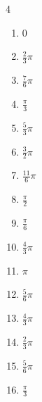 \begin{multicols}{4}
\begin{enumerate}
  \item $\displaystyle 0$

  \item $\displaystyle \frac{2}{3}\pi$

  \item $\displaystyle \frac{7}{6}\pi$

  \item $\displaystyle \frac{\pi}{3}$

  \item $\displaystyle \frac{5}{3}\pi$

  \item $\displaystyle \frac{3}{2}\pi$

  \item $\displaystyle \frac{11}{6}\pi$

  \item $\displaystyle \frac{\pi}{2}$

  \item $\displaystyle \frac{\pi}{6}$

  \item $\displaystyle \frac{4}{3}\pi$

  \item $\displaystyle \pi$

  \item $\displaystyle \frac{5}{6}\pi$

  \item $\displaystyle \frac{4}{3}\pi$

  \item $\displaystyle \frac{2}{3}\pi$

  \item $\displaystyle \frac{5}{6}\pi$

  \item $\displaystyle \frac{\pi}{3}$


\end{enumerate}
\end{multicols}
